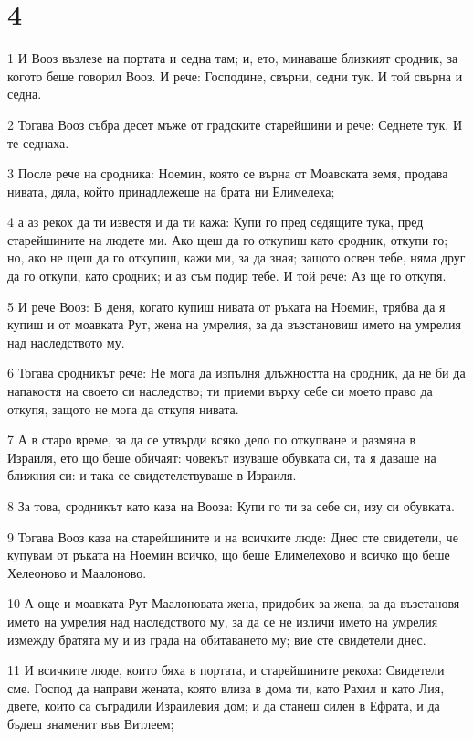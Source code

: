 \chapter{4}

\par 1 И Вооз възлезе на портата и седна там; и, ето, минаваше близкият сродник, за когото беше говорил Вооз. И рече: Господине, свърни, седни тук. И той свърна и седна.
\par 2 Тогава Вооз събра десет мъже от градските старейшини и рече: Седнете тук. И те седнаха.
\par 3 После рече на сродника: Ноемин, която се върна от Моавската земя, продава нивата, дяла, който принадлежеше на брата ни Елимелеха;
\par 4 а аз рекох да ти известя и да ти кажа: Купи го пред седящите тука, пред старейшините на людете ми. Ако щеш да го откупиш като сродник, откупи го; но, ако не щеш да го откупиш, кажи ми, за да зная; защото освен тебе, няма друг да го откупи, като сродник; и аз съм подир тебе. И той рече: Аз ще го откупя.
\par 5 И рече Вооз: В деня, когато купиш нивата от ръката на Ноемин, трябва да я купиш и от моавката Рут, жена на умрелия, за да възстановиш името на умрелия над наследството му.
\par 6 Тогава сродникът рече: Не мога да изпълня длъжността на сродник, да не би да напакостя на своето си наследство; ти приеми върху себе си моето право да откупя, защото не мога да откупя нивата.
\par 7 А в старо време, за да се утвърди всяко дело по откупване и размяна в Израиля, ето що беше обичаят: човекът изуваше обувката си, та я даваше на ближния си: и така се свидетелствуваше в Израиля.
\par 8 За това, сродникът като каза на Вооза: Купи го ти за себе си, изу си обувката.
\par 9 Тогава Вооз каза на старейшините и на всичките люде: Днес сте свидетели, че купувам от ръката на Ноемин всичко, що беше Елимелехово и всичко що беше Хелеоново и Маалоново.
\par 10 А още и моавката Рут Маалоновата жена, придобих за жена, за да възстановя името на умрелия над наследството му, за да се не изличи името на умрелия измежду братята му и из града на обитаването му; вие сте свидетели днес.
\par 11 И всичките люде, които бяха в портата, и старейшините рекоха: Свидетели сме. Господ да направи жената, която влиза в дома ти, като Рахил и като Лия, двете, които са съградили Израилевия дом; и да станеш силен в Ефрата, и да бъдеш знаменит във Витлеем;
